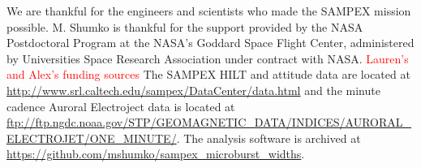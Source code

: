 \documentclass[draft]{agujournal2019}
\begin{document}
\acknowledgments
We are thankful for the engineers and scientists who made the SAMPEX mission possible. M. Shumko is thankful for the support provided by the NASA Postdoctoral Program at the NASA’s Goddard Space Flight Center, administered by Universities Space Research Association under contract with NASA. \textcolor{red}{Lauren's and Alex's funding sources} The SAMPEX HILT and attitude data are located at \url{http://www.srl.caltech.edu/sampex/DataCenter/data.html} and the minute cadence Auroral Electroject data is located at \url{ftp://ftp.ngdc.noaa.gov/STP/GEOMAGNETIC_DATA/INDICES/AURORAL_ELECTROJET/ONE_MINUTE/}.
The analysis software is archived at \textcolor{red}{\url{https://github.com/mshumko/sampex_microburst_widths}}.



%
%





%
%
%
%
%
\end{document}
